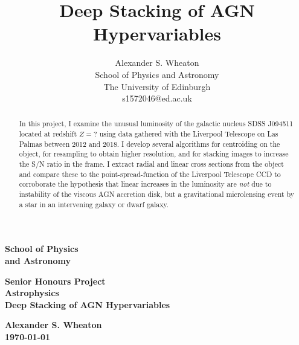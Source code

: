 \documentclass[a4paper,11pt]{article}
\title{Deep Stacking of AGN Hypervariables}
\author{
    Alexander S. Wheaton\\
    School of Physics and Astronomy\\
    The University of Edinburgh\\
    s1572046@ed.ac.uk\break
}
\begin{document}
\pagestyle{empty}                       %
\epsfxsize=40mm                         %
\begin{minipage}[b]{110mm}
    {\Huge\bf School of Physics\\ and Astronomy
    \vspace*{17mm}}
\end{minipage}
\hfill
\begin{minipage}[t]{40mm}
\end{minipage}
\par\noindent                                           %
\vspace*{2cm}
\begin{center}
    \Large\bf \Large\bf Senior Honours Project\\
    \Large\bf Astrophysics\\[10pt]                     %
    \LARGE\bf Deep Stacking of AGN Hypervariables
\end{center}
\vspace*{0.5cm}
\begin{center}
    \bf Alexander S. Wheaton\\
    \today
\end{center}
\vspace*{5mm}

\begin{abstract}
    In this project, I examine the unusual luminosity of the galactic nucleus
    SDSS J094511 located at redshift $Z=?$ using data gathered with the
    Liverpool Telescope on Las Palmas between 2012 and 2018. I develop several
    algorithms for centroiding on the object, for resampling to obtain higher
    resolution, and for stacking images to increase the S/N ratio in the frame.
    I extract radial and linear cross sections from the object and compare these
    to the point-spread-function of the Liverpool Telescope CCD to corroborate
    the hypothesis that linear increases in the luminosity are \textit{not} due
    to instability of the viscous AGN accretion disk, but a gravitational
    microlensing event by a star in an intervening galaxy or dwarf galaxy.
\end{abstract}
\end{document}
